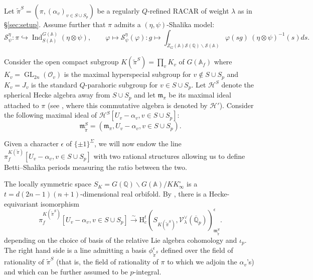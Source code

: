 \documentclass{amsart}
\theoremstyle{definition}
\newcommand{\A}{\mathbb{A}}
\newcommand{\Q}{\mathbb{Q}}
\newcommand{\cH}{\mathcal{H}}
\newcommand{\cO}{\mathcal{O}}
\newcommand{\fm}{\mathfrak{m}}
\newcommand{\Ind}{\operatorname{Ind}}
\newcommand{\GL}{\operatorname{GL}}
\begin{document}
{%


Let $\widetilde\pi^S = (\pi, (\alpha_v)_{v\in S\cup S_p})$ be a  regularly $Q$-refined RACAR
of weight $\lambda$ as in \S\ref{sec:setup}.  Assume further that $\pi$ admits a  $(\eta,\psi)$-Shalika model:
\begin{equation}\label{eq:shalika integral}
\mathcal{S}_{\psi}^\eta: \pi\hookrightarrow \Ind_{S(\A)}^{G(\A)}(\eta\otimes\psi), \qquad \varphi \mapsto 	\mathcal{S}_{\psi}^\eta(\varphi): g \mapsto \int_{Z_G(\A)\mathcal{S}(\Q)\backslash\mathcal{S}(\A)} \varphi(sg) \ (\eta \otimes \psi)^{-1}(s)ds.
\end{equation}

Consider the open compact subgroup $K(\widetilde\pi^S)=\prod_v K_v$ of  $G(\A_f)$ where
$K_v=\GL_{2n}(\cO_v)$  is  the maximal hyperspecial subgroup for $v\notin S\cup S_p$ and 
$K_v=J_v$  is  the standard $Q$-parahoric subgroup for $v\in S\cup S_p$.  
Let $\cH^S$ denote the spherical Hecke algebra away from $S\cup S_p$ and let $\fm_\pi$ be its maximal ideal attached to $\pi$
(see \cite[Def.~2.1]{BDW}, where this commutative algebra is denoted by  $\cH'$). 
Consider  the following maximal ideal of $\cH^S[U_v - \alpha_v, v\in S\cup S_p]$: 
\[\fm_{\widetilde\pi}^S=(\fm_\pi, U_v - \alpha_v, v\in S\cup S_p).\]



Given a character $\epsilon$ of  $\{\pm1\}^\Sigma$, we will now endow  the line 
$\pi_f^{K(\widetilde\pi)}[ U_v - \alpha_v, v\in S\cup S_p]$ with two rational structures 
 allowing us to define Betti--Shalika periods measuring the ratio between the two.  



The locally symmetric space $S_K = G(\Q)\backslash G(\A)/KK_{\infty}^{\circ}$  is a  $t=d(2n-1)(n+1)$-dimensional real orbifold. 
By \cite[Prop.~2.3]{BDW}, there is a Hecke-equivariant isomorphism
	\begin{equation}\label{eq:betti-shalika}
		\pi_f^{K(\widetilde\pi^S)}[ U_v - \alpha_v, v\in S\cup S_p] \xrightarrow{\sim} \mathrm{H}_c^t(S_{K(\widetilde\pi^S)}, \mathscr{V}_{\lambda}^\vee(\overline{\Q}_p))_{\fm_{\widetilde\pi}^S}^\epsilon.
	\end{equation}
depending on the choice of basis of the relative Lie algebra cohomology  and  $\iota_p$. The right hand side is a line admitting a  basis $\phi_{\widetilde\pi^S}^\epsilon$   defined over the field of rationality of $\widetilde\pi^S$ (that is, the field of rationality of $\pi$ to which we adjoin the $\alpha_v$'s) and which can be further assumed to be $p$-integral. 


}
\end{document}
